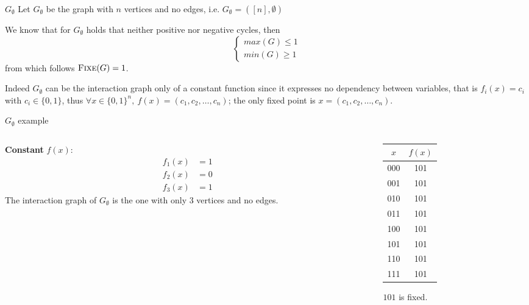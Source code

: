 \documentclass{beamer}
\begin{document}
\begin{frame}{$G_\emptyset$}
    \justifying
    Let $G_\emptyset$ be the graph with $n$ vertices and no edges, i.e. $G_\emptyset = ([n], \emptyset)$
    
    
    We know that for $G_\emptyset$ holds that neither positive nor negative cycles, then 
    \[
    \begin{cases}
        max(G) \leq 1\\
        min(G) \geq 1
    \end{cases}
    \]
    from which follows $\textsc{Fixe}(G) = 1$.
    
    
    Indeed $G_\emptyset$ can be the interaction graph only of a constant function since it expresses no dependency between variables, that is
    $f_i(x) = c_i$ with $c_i \in \{0,1\}$, thus $\forall x \in \{0,1\}^n,\ f(x) = (c_1, c_2, \dots, c_n)$; the only fixed point is $x = (c_1, c_2, \dots, c_n)$.
\end{frame}

\begin{frame}{$G_\emptyset$ example}
    \begin{example}
        \vspace{-1em}
        \begin{columns}
            \begin{column}{0.4\textwidth}
                \justifying
                \textbf{Constant} $f(x)$:
                \begin{alignat*}{2}
                f_1(x) &= 1 \\
                f_2(x) &= 0 \\
                f_3(x) &= 1
                \end{alignat*}
                The interaction graph of $G_\emptyset$ is the one with only 3 vertices and no edges.
        	\end{column}
            \begin{column}{0.3\textwidth}
                \begin{table}
        		\begin{tabular}{c|c}
        		$x$ & $f(x)$ \\\hline
        		000 & 101 \\
        		001 & 101 \\
        		010 & 101 \\
        		011 & 101 \\
        		100 & 101 \\
        		101 & 101 \\
        		110 & 101 \\
        		111 & 101 \\
        		\end{tabular}
        		\end{table}
        		\centering
        		$101$ is fixed.
        	\end{column}
        \end{columns}
    \end{example}
\end{frame}
\end{document}
